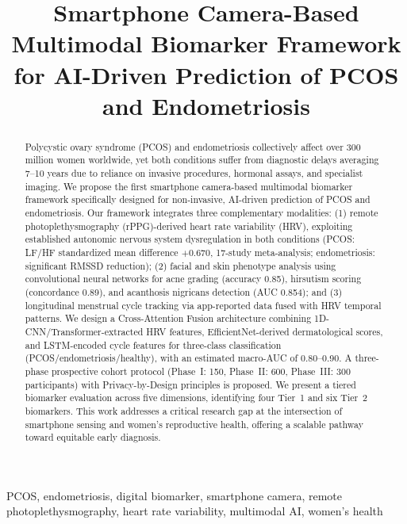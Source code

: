 \documentclass[conference]{IEEEtran}
\begin{document}
\title{Smartphone Camera-Based Multimodal Biomarker Framework for AI-Driven Prediction of PCOS and Endometriosis}

\author{
}

\maketitle

\begin{abstract}
Polycystic ovary syndrome (PCOS) and endometriosis collectively affect over 300 million women worldwide, yet both conditions suffer from diagnostic delays averaging 7--10 years due to reliance on invasive procedures, hormonal assays, and specialist imaging. We propose the first smartphone camera-based multimodal biomarker framework specifically designed for non-invasive, AI-driven prediction of PCOS and endometriosis. Our framework integrates three complementary modalities: (1) remote photoplethysmography (rPPG)-derived heart rate variability (HRV), exploiting established autonomic nervous system dysregulation in both conditions (PCOS: LF/HF standardized mean difference $+0.670$, 17-study meta-analysis; endometriosis: significant RMSSD reduction); (2) facial and skin phenotype analysis using convolutional neural networks for acne grading (accuracy 0.85), hirsutism scoring (concordance 0.89), and acanthosis nigricans detection (AUC 0.854); and (3) longitudinal menstrual cycle tracking via app-reported data fused with HRV temporal patterns. We design a Cross-Attention Fusion architecture combining 1D-CNN/Transformer-extracted HRV features, EfficientNet-derived dermatological scores, and LSTM-encoded cycle features for three-class classification (PCOS/endometriosis/healthy), with an estimated macro-AUC of 0.80--0.90. A three-phase prospective cohort protocol (Phase~I: 150, Phase~II: 600, Phase~III: 300 participants) with Privacy-by-Design principles is proposed. We present a tiered biomarker evaluation across five dimensions, identifying four Tier~1 and six Tier~2 biomarkers. This work addresses a critical research gap at the intersection of smartphone sensing and women's reproductive health, offering a scalable pathway toward equitable early diagnosis.
\end{abstract}

\begin{IEEEkeywords}
PCOS, endometriosis, digital biomarker, smartphone camera, remote photoplethysmography, heart rate variability, multimodal AI, women's health
\end{IEEEkeywords}
\end{document}
